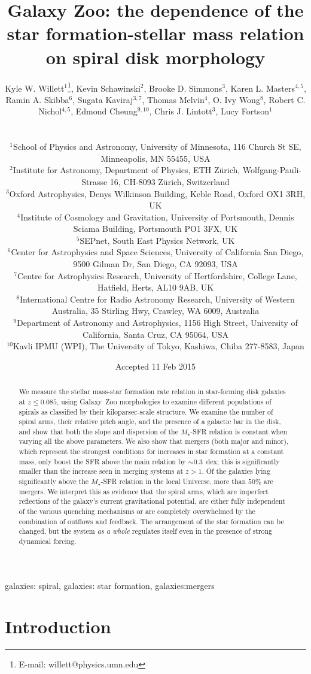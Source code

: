 \documentclass[useAMS,usenatbib]{mn2e}
\title[Disk galaxy morphology and the star-forming main sequence]{Galaxy Zoo: the dependence of the star formation-stellar mass relation on spiral disk morphology}
\author[Willett et al.]{
  \parbox[t]{16cm}{
  Kyle W. Willett$^{1}$\thanks{E-mail: willett@physics.umn.edu},
  Kevin Schawinski$^{2}$,
  Brooke D. Simmons$^{3}$,
  Karen L. Masters$^{4,5}$,
  Ramin A. Skibba$^{6}$,
  Sugata Kaviraj$^{3,7}$,
  Thomas Melvin$^{4}$,
  O. Ivy Wong$^{8}$,
  Robert C. Nichol$^{4,5}$,
  Edmond Cheung$^{9,10}$,
  Chris J. Lintott$^{3}$,
  Lucy Fortson$^{1}$
  \\
  }\\
$^{1}$School of Physics and Astronomy, University of Minnesota, 116 Church St SE, Minneapolis, MN 55455, USA \\
$^{2}$Institute for Astronomy, Department of Physics, ETH Z\"urich, Wolfgang-Pauli-Strasse 16, CH-8093 Z\"urich, Switzerland \\
$^{3}$Oxford Astrophysics, Denys Wilkinson Building, Keble Road, Oxford OX1 3RH, UK \\
$^{4}$Institute of Cosmology and Gravitation, University of Portsmouth, Dennis Sciama Building, Portsmouth PO1 3FX, UK \\
$^{5}$SEPnet, South East Physics Network, UK \\
$^{6}$Center for Astrophysics and Space Sciences, University of California San Diego, 9500 Gilman Dr, San Diego, CA 92093, USA \\
$^{7}$Centre for Astrophysics Research, University of Hertfordshire, College Lane, Hatfield, Herts, AL10 9AB, UK \\
$^{8}$International Centre for Radio Astronomy Research, University of Western Australia, 35 Stirling Hwy, Crawley, WA 6009, Australia \\
$^{9}$Department of Astronomy and Astrophysics, 1156 High Street, University of California, Santa Cruz, CA 95064, USA\\
$^{10}$Kavli IPMU (WPI), The University of Tokyo, Kashiwa, Chiba 277-8583, Japan\\
}
\begin{document}
\date{Accepted 11 Feb 2015}
\pagerange{\pageref{firstpage}--\pageref{lastpage}} 
\maketitle
\label{firstpage}



\begin{abstract}
We measure the stellar mass-star formation rate relation in star-forming disk galaxies at $z\le0.085$, using Galaxy~Zoo morphologies to examine different populations of spirals as classified by their kiloparsec-scale structure. We examine the number of spiral arms, their relative pitch angle, and the presence of a galactic bar in the disk, and show that both the slope and dispersion of the $M_\star$-SFR relation is constant when varying all the above parameters. We also show that mergers (both major and minor), which represent the strongest conditions for increases in star formation at a constant mass, only boost the SFR above the main relation by $\sim0.3$~dex; this is significantly smaller than the increase seen in merging systems at $z>1$. Of the galaxies lying significantly above the $M_\star$-SFR relation in the local Universe, more than $50\%$ are mergers. We interpret this as evidence that the spiral arms, which are imperfect reflections of the galaxy's current gravitational potential, are either fully independent of the various quenching mechanisms or are completely overwhelmed by the combination of outflows and feedback. The arrangement of the star formation can be changed, but the system \emph{as a whole} regulates itself even in the presence of strong dynamical forcing. 
\end{abstract}

\begin{keywords}
galaxies: spiral, galaxies: star formation, galaxies:mergers
\end{keywords}


\section{Introduction} \label{sec-intro}
\end{document}
